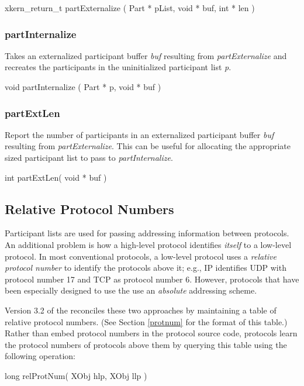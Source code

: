 {\sem xkern\_return\_t} {\bold partExternalize}
( {\sem Part *} {\caps pList}, {\sem void *} {\caps buf}, 
  {\sem int *} {\caps len} )
\medskip


\subsubsection{partInternalize}
Takes an externalized participant buffer {\em buf} resulting
from {\em partExternalize} and recreates the participants in the
uninitialized participant list {\em p}.
\medskip

{\sem void} {\bold partInternalize}
( {\sem Part *} {\caps p}, {\sem void *} {\caps buf} )
\medskip


\subsubsection{partExtLen}
Report the number of participants in an externalized participant
buffer {\em buf} resulting from {\em partExternalize}.  
This can be useful for allocating the appropriate
sized participant list to pass to {\em partInternalize}.
\medskip

{\sem int} {\bold partExtLen}( {\sem void *} {\caps buf} )
\medskip


\subsection{Relative Protocol Numbers}
\label{relprotnum}

Participant lists are used for passing addressing information between
protocols. An additional problem is how a high-level protocol
identifies {\em itself} to a low-level protocol.  In most conventional
protocols, a low-level protocol uses a {\em relative protocol number}
to identify the protocols above it; e.g., IP identifies UDP with
protocol number 17 and TCP as protocol number 6. However, protocols
that have been especially designed to use the \xk{} use an
{\em absolute} addressing scheme.

Version 3.2 of the \xk{} reconciles these two approaches by
maintaining a table of relative protocol numbers.  (See Section
\ref{protnum} for the format of this table.)  Rather than embed
protocol numbers in the protocol source code, protocols learn the
protocol numbers of protocols above them by querying this table using
the following operation:
\medskip

{\sem long}	{\bold relProtNum}( {\sem XObj} {\caps hlp}, {\sem XObj} {\caps llp} )
\medskip


